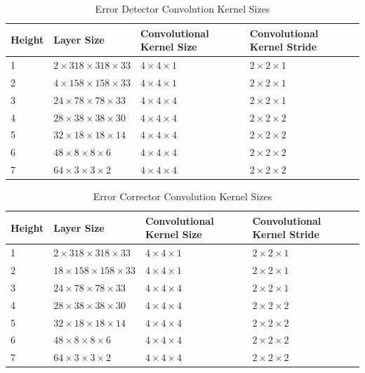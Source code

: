 \documentclass{article}
\begin{document}
\begin{table}[h]
  \caption{Error Detector Convolution Kernel Sizes}
  \label{table:sizes}
  \centering
  \begin{tabular}{llll}
    \toprule
	Height & Layer Size & Convolutional Kernel Size & Convolutional Kernel Stride\\
	\midrule
	1 & $2\times 318\times 318\times 33$ & $4\times 4\times1$ & $2\times2\times1$\\
	2 & $4\times 158\times 158\times 33$ & $4\times4\times1$ & $2\times2\times1$\\
	3 & $24\times 78\times 78\times 33$ & $4\times4\times4$ & $2\times2\times1$\\
	4 & $28\times 38\times 38\times 30$ & $4\times4\times4$ & $2\times2\times2$\\
	5 & $32\times 18\times 18\times 14$ & $4\times4\times4$ & $2\times2\times2$\\
	6 & $48\times 8\times 8\times 6$ & $4\times4\times4$ & $2\times2\times2$\\
	7 & $64\times 3\times 3\times 2$ & $4\times4\times4$ & $2\times2\times2$\\
    \bottomrule
  \end{tabular}
\end{table}
\begin{table}[h]
  \caption{Error Corrector Convolution Kernel Sizes}
  \centering
  \begin{tabular}{llll}
    \toprule
	Height & Layer Size & Convolutional Kernel Size & Convolutional Kernel Stride\\
	\midrule
	1 & $2\times 318\times 318\times 33$ & $4\times 4\times1$ & $2\times2\times1$\\
	2 & $18\times 158\times 158\times 33$ & $4\times4\times1$ & $2\times2\times1$\\
	3 & $24\times 78\times 78\times 33$ & $4\times4\times4$ & $2\times2\times1$\\
	4 & $28\times 38\times 38\times 30$ & $4\times4\times4$ & $2\times2\times2$\\
	5 & $32\times 18\times 18\times 14$ & $4\times4\times4$ & $2\times2\times2$\\
	6 & $48\times 8\times 8\times 6$ & $4\times4\times4$ & $2\times2\times2$\\
	7 & $64\times 3\times 3\times 2$ & $4\times4\times4$ & $2\times2\times2$\\
    \bottomrule
  \end{tabular}
\end{table}
\end{document}

